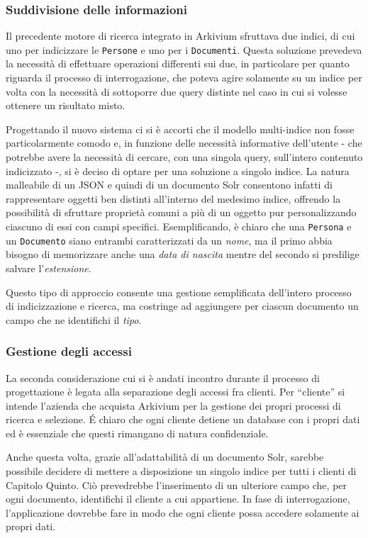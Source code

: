 \subsubsection{Suddivisione delle informazioni}

Il precedente motore di ricerca integrato in Arkivium sfruttava due indici, di cui uno per indicizzare le \texttt{Persone} e uno per i \texttt{Documenti}. Questa soluzione prevedeva la necessità di effettuare operazioni differenti sui due, in particolare per quanto riguarda il processo di interrogazione, che poteva agire solamente su un indice per volta con la necessità di sottoporre due query distinte nel caso in cui si volesse ottenere un risultato misto.

Progettando il nuovo sistema ci si è accorti che il modello multi-indice non fosse particolarmente comodo e, in funzione delle necessità informative dell’utente - che potrebbe avere la necessità di cercare, con una singola query, sull’intero contenuto indicizzato -, si è deciso di optare per una soluzione a singolo indice. La natura malleabile di un JSON e quindi di un documento Solr consentono infatti di rappresentare oggetti ben distinti all’interno del medesimo indice, offrendo la possibilità di sfruttare proprietà comuni a più di un oggetto pur personalizzando ciascuno di essi con campi specifici. Esemplificando, è chiaro che una \texttt{Persona} e un \texttt{Documento} siano entrambi caratterizzati da un \textit{nome}, ma il primo abbia bisogno di memorizzare anche una \textit{data di nascita} mentre del secondo si predilige salvare l’\textit{estensione}.

Questo tipo di approccio consente una gestione semplificata dell’intero processo di indicizzazione e ricerca, ma costringe ad aggiungere per ciascun documento un campo che ne identifichi il \textit{tipo}.


\subsubsection{Gestione degli accessi}

La seconda considerazione cui si è andati incontro durante il processo di progettazione è legata alla separazione degli accessi fra clienti. Per “cliente” si intende l’azienda che acquista Arkivium per la gestione dei propri processi di ricerca e selezione. É chiaro che ogni cliente detiene un database con i propri dati ed è essenziale che questi rimangano di natura confidenziale.

Anche questa volta, grazie all’adattabilità di un documento Solr, sarebbe possibile decidere di mettere a disposizione un singolo indice per tutti i clienti di Capitolo Quinto. Ciò prevedrebbe l’inserimento di un ulteriore campo che, per ogni documento, identifichi il cliente a cui appartiene. In fase di interrogazione, l’applicazione dovrebbe fare in modo che ogni cliente possa accedere solamente ai propri dati.

